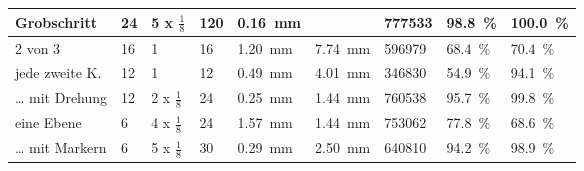 \documentclass[./00PhotoBox.tex]{subfiles}
\begin{document}
\begin{table}
{\begin{tabular}{l|l|l|l|l|l|l|l|l}
            Grobschritt    & 24                                                                & 5 x $\frac{1}{8}$        & 120                      & \SI{0,16}{\milli\metre}                                             & \cellcolor[HTML]{EEEEEE}                                            & 777533               & \SI{98,8}{\percent}                        & \SI{100,0}{\percent}                       \\ \hline
            2 von 3        & 16                                                                & 1                        & 16                       & {\color[HTML]{FF0000} \SI{1,20}{\milli\metre}}                      & {\color[HTML]{FF0000} \SI{7,74}{\milli\metre}}                      & 596979               & {\color[HTML]{FF0000} \SI{68,4}{\percent}} & {\color[HTML]{FF0000} \SI{70,4}{\percent}} \\ \hline
            jede zweite K. & 12                                                                & 1                        & 12                       & \SI{0,49}{\milli\metre}                                             & \SI{4,01}{\milli\metre}                                             & 346830               & {\color[HTML]{FF0000} \SI{54,9}{\percent}} & \SI{94,1}{\percent}                        \\
            … mit Drehung  & 12                                                                & 2 x $\frac{1}{8}$        & 24                       & \SI{0,25}{\milli\metre}                                             & \SI{1,44}{\milli\metre}                                             & 760538               & \SI{95,7}{\percent}                        & \SI{99,8}{\percent}                        \\ \hline
            eine Ebene     & 6                                                                 & 4 x $\frac{1}{8}$        & 24                       & {\color[HTML]{FF0000} \SI{1,57}{\milli\metre}}                      & \SI{1,44}{\milli\metre}                                             & 753062               & {\color[HTML]{FF0000} \SI{77,8}{\percent}} & {\color[HTML]{FF0000} \SI{68,6}{\percent}} \\
            … mit Markern  & 6                                                                 & 5 x $\frac{1}{8}$        & 30                       & \SI{0,29}{\milli\metre}                                             & \SI{2,50}{\milli\metre}                                             & 640810               & \SI{94,2}{\percent}                        & \SI{98,9}{\percent}
        \end{tabular}
    }
\end{table}
\end{document}
